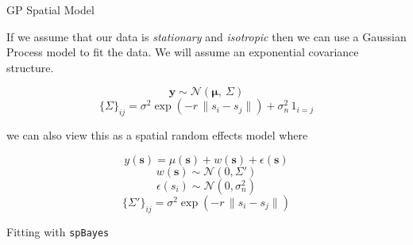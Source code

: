 \documentclass[11pt,ignorenonframetext,]{beamer}
\newenvironment{Shaded}{}{}
\newcommand{\DataTypeTok}[1]{\textcolor[rgb]{0.56,0.13,0.00}{#1}}
\newcommand{\DecValTok}[1]{\textcolor[rgb]{0.25,0.63,0.44}{#1}}
\newcommand{\FloatTok}[1]{\textcolor[rgb]{0.25,0.63,0.44}{#1}}
\newcommand{\KeywordTok}[1]{\textcolor[rgb]{0.00,0.44,0.13}{\textbf{#1}}}
\newcommand{\NormalTok}[1]{#1}
\newcommand{\OperatorTok}[1]{\textcolor[rgb]{0.40,0.40,0.40}{#1}}
\newcommand{\StringTok}[1]{\textcolor[rgb]{0.25,0.44,0.63}{#1}}
\let\oldShaded\Shaded
\let\endoldShaded\endShaded
\renewenvironment{Shaded}{\footnotesize\begin{spacing}{0.9}\oldShaded}{\endoldShaded\end{spacing}}
\begin{document}
\begin{frame}{GP Spatial Model}
\protect\hypertarget{gp-spatial-model}{}

\small

If we assume that our data is \emph{stationary} and \emph{isotropic}
then we can use a Gaussian Process model to fit the data. We will assume
an exponential covariance structure.

\[ \symbf{y} \sim \mathcal{N}(\symbf{\mu},~\Sigma) \]
\[ \{\Sigma\}_{ij} = \sigma^2 \exp(- r \, \lVert s_i - s_j\lVert) + \sigma^2_n \, 1_{i=j} \]

\pause

we can also view this as a spatial random effects model where

\[ y(\symbf{s}) = \mu(\symbf{s}) + w(\symbf{s}) + \epsilon(\symbf{s}) \]
\[ w(\symbf{s}) \sim \mathcal{N}(0,\Sigma') \]
\[ \epsilon(s_i) \sim \mathcal{N}(0,\sigma^2_n) \]
\[ \{\Sigma'\}_{ij} = \sigma^2 \exp(- r \, \lVert s_i - s_j\lVert) \]

\end{frame}

\begin{frame}[fragile,t]{Fitting with \texttt{spBayes}}
\protect\hypertarget{fitting-with-spbayes}{}

\begin{Shaded}
\end{Shaded}

\end{frame}
\end{document}
